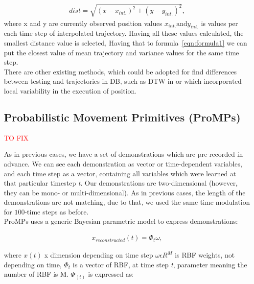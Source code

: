\begin{equation}
\begin{split}
dist = \displaystyle \sqrt{(x - x_{int.})^2 + (y - y_{int.})^2},
\end{split}
\label{eqn:distance}
\end{equation}
where x and y are currently observed position values $x_{int.} \text{and} y_{int.}$ is values per each time step of interpolated trajectory. Having all these values calculated, the smallest distance value is selected, Having that to formula~\ref{eqn:formula1} we can put the closest value of mean trajectory and variance values for the same time step. \\
There are other existing methods, which could be adopted for find differences between testing and trajectories in \gls{DB}, such as \gls{DTW} in \cite{DTW} or \cite{PossExecution} which incorporated local variability in the execution of position.

\subsection{Probabilistic Movement Primitives (\gls{ProMPs})}

\textcolor{red}{TO FIX} 

As in previous cases, we have a set of demonstrations which are pre-recorded in advance. We can see each demonstration as vector or time-dependent variables, and each time step as a vector, containing all variables which were learned at that particular timestep \textit{t}. Our demonstrations are two-dimensional (however, they can be mono- or multi-dimensional). As in previous cases, the length of the demonstrations are not matching, due to that, we used the same time modulation for $100$-time steps as before. \\
\gls{ProMPs} uses a generic Bayesian parametric model to express demonstrations:

\begin{equation}
\begin{split}
x_{reconstructed}(t) = \displaystyle \Phi_{t}\omega,
\end{split}
\label{eqn:ProMPs}
\end{equation}

where $x(t)$ x dimension depending on time step $\omega \epsilon R^M$ is \gls{RBF} weights, not depending on time, $\Phi_{t}$ is a vector of \gls{RBF}, at time step \textit{t}, parameter meaning the number of \gls{RBF} is M. $\Phi_(t)$ is expressed as:

